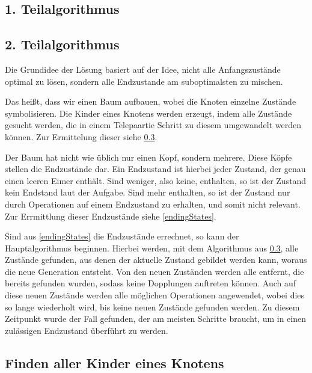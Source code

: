 \documentclass[a4paper,10pt,ngerman]{scrartcl}
\begin{document}
\subsection{1. Teilalgorithmus}

\subsection{2. Teilalgorithmus}

Die Grundidee der Lösung basiert auf der Idee, nicht alle Anfangszustände optimal zu lösen, sondern alle Endzustande am suboptimalsten zu mischen.

Das heißt, dass wir einen Baum  aufbauen, wobei die Knoten einzelne Zustände symbolisieren.
Die Kinder eines Knotens werden erzeugt, indem alle Zustände gesucht werden, die in einem Telepaartie Schritt zu diesem umgewandelt werden können. Zur Ermittelung dieser siehe \cref{childGen}.

Der Baum hat nicht wie üblich nur einen Kopf, sondern mehrere. Diese Köpfe stellen die Endzustände dar. Ein Endzustand ist hierbei jeder Zustand, der genau einen leeren Eimer enthält. Sind weniger, also keine, enthalten, so ist der Zustand kein Endstand laut der Aufgabe. Sind mehr enthalten, so ist der Zustand nur durch Operationen auf einem Endzustand zu erhalten, und somit nicht relevant. Zur Errmittlung dieser Endzustände siehe \cref{endingStates}.

Sind aus \cref{endingStates} die Endzustände errechnet, so kann der Hauptalgorithmus beginnen.
Hierbei werden, mit dem Algorithmus aus \cref{childGen},  alle Zustände gefunden, aus denen der aktuelle Zustand gebildet werden kann, woraus die neue Generation entsteht.
Von den neuen Zuständen werden alle entfernt, die bereits gefunden wurden, sodass keine Dopplungen auftreten können. Auch auf diese neuen Zustände werden alle möglichen Operationen angewendet, wobei dies so lange wiederholt wird, bis keine neuen Zustände gefunden werden. Zu diesem Zeitpunkt wurde der Fall gefunden, der am meisten Schritte braucht, um in einen zulässigen Endzustand überführt zu werden.

\subsection{Finden aller Kinder eines Knotens} \label{childGen}
\end{document}
